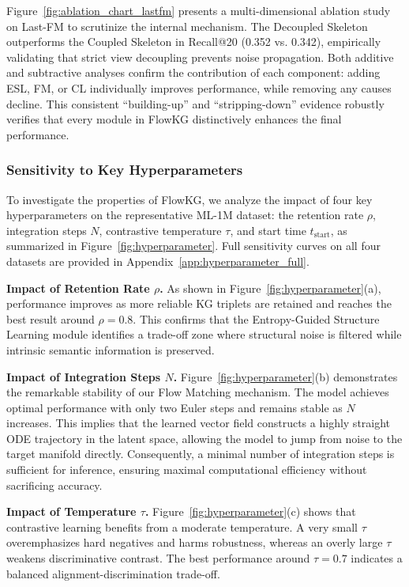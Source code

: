Figure~\ref{fig:ablation_chart_lastfm} presents a multi-dimensional ablation study on Last-FM to scrutinize the internal mechanism. The Decoupled Skeleton outperforms the Coupled Skeleton in Recall@20 (0.352 vs. 0.342), empirically validating that strict view decoupling prevents noise propagation. Both additive and subtractive analyses confirm the contribution of each component: adding ESL, FM, or CL individually improves performance, while removing any causes decline. This consistent ``building-up'' and ``stripping-down'' evidence robustly verifies that every module in FlowKG distinctively enhances the final performance.


\subsubsection{\textbf{Sensitivity to Key Hyperparameters}}
To investigate the properties of FlowKG, we analyze the impact of four key hyperparameters on the representative ML-1M dataset: the retention rate $\rho$, integration steps $N$, contrastive temperature $\tau$, and start time $t_{\mathrm{start}}$, as summarized in Figure~\ref{fig:hyperparameter}. Full sensitivity curves on all four datasets are provided in Appendix~\ref{app:hyperparameter_full}.


\noindent\textbf{Impact of Retention Rate $\rho$.}
As shown in Figure~\ref{fig:hyperparameter}(a), performance improves as more reliable KG triplets are retained and reaches the best result around $\rho=0.8$. This confirms that the Entropy-Guided Structure Learning module identifies a trade-off zone where structural noise is filtered while intrinsic semantic information is preserved.

\noindent\textbf{Impact of Integration Steps $N$.}
Figure~\ref{fig:hyperparameter}(b) demonstrates the remarkable stability of our Flow Matching mechanism. The model achieves optimal performance with only two Euler steps and remains stable as $N$ increases. This implies that the learned vector field constructs a highly straight ODE trajectory in the latent space, allowing the model to jump from noise to the target manifold directly. Consequently, a minimal number of integration steps is sufficient for inference, ensuring maximal computational efficiency without sacrificing accuracy.

\noindent\textbf{Impact of Temperature $\tau$.}
Figure~\ref{fig:hyperparameter}(c) shows that contrastive learning benefits from a moderate temperature. A very small $\tau$ overemphasizes hard negatives and harms robustness, whereas an overly large $\tau$ weakens discriminative contrast. The best performance around $\tau=0.7$ indicates a balanced alignment-discrimination trade-off.

